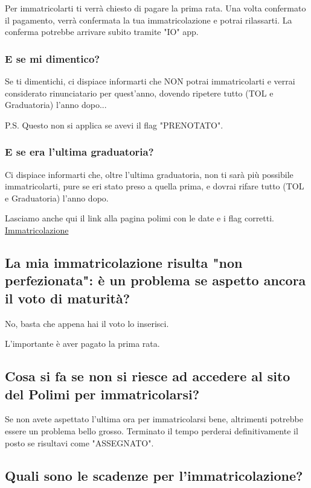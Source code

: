\documentclass[legal]{polinetwork}
\begin{document}
Per immatricolarti ti verrà chiesto di pagare la prima rata. Una volta confermato il pagamento, verrà confermata la tua immatricolazione e potrai rilassarti. La conferma potrebbe arrivare subito tramite "IO" app.

\subsubsection{E se mi dimentico?}


Se ti dimentichi, ci dispiace informarti che NON potrai immatricolarti e verrai considerato rinunciatario per quest'anno, dovendo ripetere tutto (TOL e Graduatoria) l'anno dopo...

P.S. Questo non si applica se avevi il flag "PRENOTATO".

\subsubsection{E se era l'ultima graduatoria?}


Ci dispiace informarti che, oltre l'ultima graduatoria, non ti sarà più possibile immatricolarti, pure se eri stato preso a quella prima, e dovrai rifare tutto (TOL e Graduatoria) l'anno dopo.

Lasciamo anche qui il link alla pagina polimi con le date e i flag corretti. \href{https://www.polimi.it/futuri-studenti/test-e-ammissione/laurea/ingegneria/quando-immatricolarsi}{Immatricolazione}

\subsection{La mia immatricolazione risulta "non perfezionata": è un problema se aspetto ancora il voto di maturità?}


No, basta che appena hai il voto lo inserisci.

L'importante è aver pagato la prima rata.

\subsection{Cosa si fa se non si riesce ad accedere al sito del Polimi per immatricolarsi?}


Se non avete aspettato l'ultima ora per immatricolarsi bene, altrimenti potrebbe essere un problema bello grosso. Terminato il tempo perderai definitivamente il posto se risultavi come "ASSEGNATO".

\subsection{Quali sono le scadenze per l'immatricolazione?}
\end{document}
